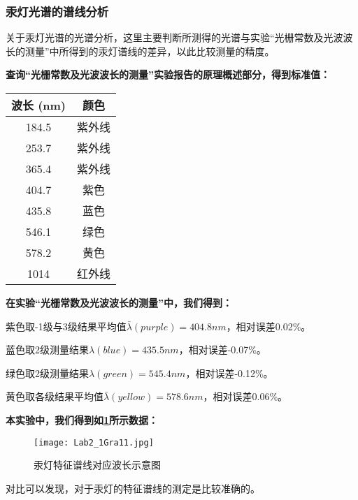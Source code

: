 \documentclass[dvipsnames, svgnames,a4paper,11pt]{article}
\begin{document}
	\subsubsection{汞灯光谱的谱线分析}
	关于汞灯光谱的光谱分析，这里主要判断所测得的光谱与实验“光栅常数及光波波长的测量”中所得到的汞灯谱线的差异，以此比较测量的精度。
	
	\textbf{查询“光栅常数及光波波长的测量”实验报告的原理概述部分，得到标准值：}
	
	\begin{center}
		\begin{tabular}{|c|c|}
			\hline
			波长 (nm) & 颜色 \\
			\hline
			184.5 & 紫外线 \\
			253.7 & 紫外线 \\
			365.4 & 紫外线 \\
			404.7 & 紫色 \\
			435.8 & 蓝色 \\
			546.1 & 绿色 \\
			578.2 & 黄色 \\
			1014 & 红外线 \\
			\hline
		\end{tabular}
	\end{center}
	
	\textbf{在实验“光栅常数及光波波长的测量”中，我们得到：}
	
	紫色取-1级与3级结果平均值$\bar{\lambda}(purple)=404.8nm$，相对误差0.02\%。
	
	蓝色取2级测量结果$\lambda(blue)=435.5nm$，相对误差-0.07\%。
	
	绿色取2级测量结果$\lambda(green)=545.4nm$，相对误差-0.12\%。
	
	黄色取各级结果平均值$\bar{\lambda}(yellow)=578.6nm$，相对误差0.06\%。
	
	\textbf{本实验中，我们得到如\cref{fig:fig11}所示数据：}
	
	\begin{figure}[htbp]
		\centering
		\texttt{[image: Lab2\_1Gra11.jpg]}
		\caption{汞灯特征谱线对应波长示意图}
		\label{fig:fig11}
	\end{figure}
	
	对比可以发现，对于汞灯的特征谱线的测定是比较准确的。
	
\end{document}
